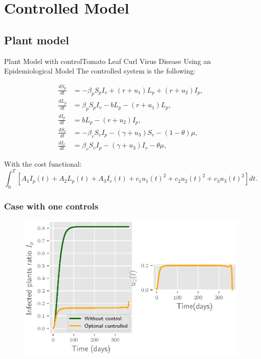 \documentclass[10pt]{beamer}
\begin{document}
\section{Controlled Model}
\subsection{Plant model}
\begin{frame}{Plant Model with control}{Tomato Leaf Curl Virus Disease Using an Epidemiological Model}
The controlled system is the following:

    \begin{equation*}
        \begin{align*}
            \frac{dS_p}{dt} &=-\beta_p S_p I_v +(r +u_1)L_p + (r + u_2) I_p,\\
            \frac{dL_p}{dt} &=\beta_p S_p I_v -b L_p -(r + u_1)L_p,\\
            \frac{dI_p}{dt} &= b L_p - (r + u_2) I_p,\\
            \frac{dS_v}{dt} &=-\beta_v S_v I_p - (\gamma+u_3) S_v -(1-\theta)\mu,\\
            \frac{dI_v}{dt} &=\beta_v S_v I_p -(\gamma+u_3) I_v -\theta\mu,				
        \end{align*}
    \end{equation*}
\end{frame}

\begin{frame}
	With the cost functional:
	\begin{equation*}
	\int_{0}^T
	\left[
	A_1 I_p(t) + A_2 L_p(t) + A_3 I_v(t)
	+ c_1 u_1(t)^2 + c_2 u_2(t)^2 + c_3 u_3(t)^2
	\right] dt.
	\end{equation*}
		
\end{frame}

\begin{frame}
\frametitle{Case with one controls}
\begin{figure}
	\centering	
	\includegraphics[scale=0.5]{Feathergraphics/figure_1_tomato_one_control.eps}
\end{figure}	
\end{frame}
\end{document}
